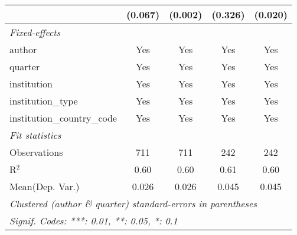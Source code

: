 \begin{tabular}{lcccc}
                                            & (0.067) & (0.002) & (0.326)   & (0.020)\\   
   \midrule
   \emph{Fixed-effects}\\
   author                                   & Yes     & Yes     & Yes       & Yes\\  
   quarter                                  & Yes     & Yes     & Yes       & Yes\\  
   institution                              & Yes     & Yes     & Yes       & Yes\\  
   institution\_type                        & Yes     & Yes     & Yes       & Yes\\  
   institution\_country\_code               & Yes     & Yes     & Yes       & Yes\\  
   \midrule
   \emph{Fit statistics}\\
   Observations                             & 711     & 711     & 242       & 242\\  
   R$^2$                                    & 0.60    & 0.60    & 0.61      & 0.60\\  
Mean(Dep. Var.) & 0.026 & 0.026 & 0.045 & 0.045 \\
   \midrule \midrule
   \multicolumn{5}{l}{\emph{Clustered (author \& quarter) standard-errors in parentheses}}\\
   \multicolumn{5}{l}{\emph{Signif. Codes: ***: 0.01, **: 0.05, *: 0.1}}\\
\end{tabular}
\par\endgroup
